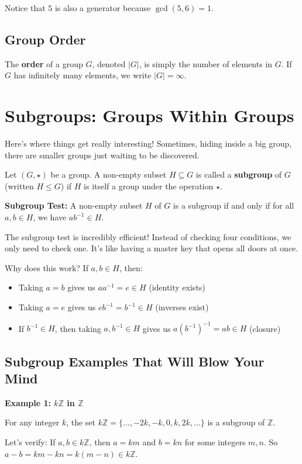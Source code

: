 \documentclass[12pt]{article}
\begin{document}
Notice that $5$ is also a generator because $\gcd(5,6) = 1$.

\subsection{\textcolor{HeaderColor}{Group Order}}

The \textbf{order} of a group $G$, denoted $|G|$, is simply the number of elements in $G$. If $G$ has infinitely many elements, we write $|G| = \infty$.

\section{\textcolor{SectionColor}{Subgroups: Groups Within Groups}}

Here's where things get really interesting! Sometimes, hiding inside a big group, there are smaller groups just waiting to be discovered.

\begin{definitionbox}
Let $(G, \star)$ be a group. A non-empty subset $H \subseteq G$ is called a \textbf{subgroup} of $G$ (written $H \leq G$) if $H$ is itself a group under the operation $\star$.

\textbf{Subgroup Test:} A non-empty subset $H$ of $G$ is a subgroup if and only if for all $a, b \in H$, we have $ab^{-1} \in H$.
\end{definitionbox}

The subgroup test is incredibly efficient! Instead of checking four conditions, we only need to check one. It's like having a master key that opens all doors at once.

Why does this work? If $a, b \in H$, then:
\begin{itemize}
\item Taking $a = b$ gives us $aa^{-1} = e \in H$ (identity exists)
\item Taking $a = e$ gives us $eb^{-1} = b^{-1} \in H$ (inverses exist)  
\item If $b^{-1} \in H$, then taking $a, b^{-1} \in H$ gives us $a(b^{-1})^{-1} = ab \in H$ (closure)
\end{itemize}

\subsection{\textcolor{HeaderColor}{Subgroup Examples That Will Blow Your Mind}}

\begin{examplebox}
\textbf{Example 1: $k\mathbb{Z}$ in $\mathbb{Z}$}

For any integer $k$, the set $k\mathbb{Z} = \{..., -2k, -k, 0, k, 2k, ...\}$ is a subgroup of $\mathbb{Z}$.

Let's verify: If $a, b \in k\mathbb{Z}$, then $a = km$ and $b = kn$ for some integers $m, n$.
So $a - b = km - kn = k(m-n) \in k\mathbb{Z}$.
\end{examplebox}
\end{document}
